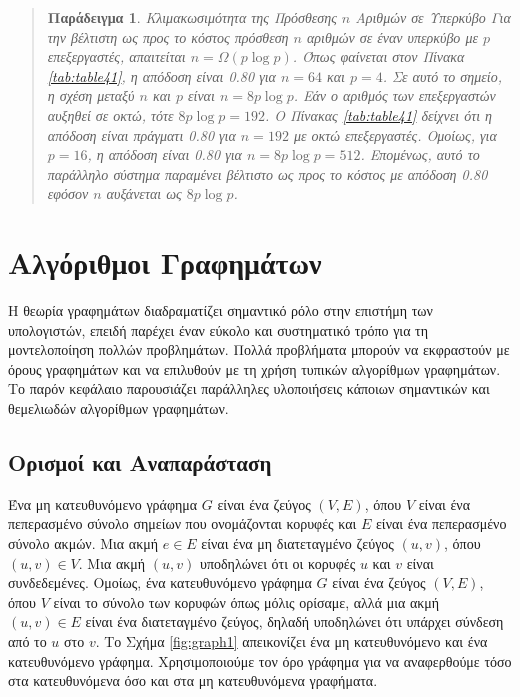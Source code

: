 \documentclass[12pt,a4paper]{article}
\newtheorem{paradeigma}{Παράδειγμα}
\begin{document}
\begin{quote}
\begin{paradeigma} \label{par:10} Κλιμακωσιμότητα της Πρόσθεσης $n$ 
  Αριθμών σε Υπερκύβο
Για την βέλτιστη ως προς το κόστος πρόσθεση $n$ αριθμών σε έναν υπερκύβο 
με $p$ επεξεργαστές, απαιτείται $n = \Omega(p \log p)$. Όπως φαίνεται στον 
Πίνακα \ref{tab:table41}, η απόδοση είναι 0.80 για $n = 64$ και $p = 4$. 
Σε αυτό το σημείο, η σχέση μεταξύ $n$ και $p$ είναι $n = 8p \log p$. Εάν 
ο αριθμός των επεξεργαστών αυξηθεί σε οκτώ, τότε $8p \log p = 192$. Ο 
Πίνακας \ref{tab:table41} δείχνει ότι η απόδοση είναι πράγματι 0.80 για 
$n = 192$ με οκτώ επεξεργαστές. Ομοίως, για $p = 16$, η απόδοση είναι 
0.80 για $n = 8p \log p = 512$. Επομένως, αυτό το παράλληλο σύστημα 
παραμένει βέλτιστο ως προς το κόστος με απόδοση 0.80 εφόσον $n$ αυξάνεται 
ως $8p \log p$.
\end{paradeigma}
\end{quote}
\vspace{0.2cm}

\section{Αλγόριθμοι Γραφημάτων}
Η θεωρία γραφημάτων διαδραματίζει σημαντικό ρόλο στην επιστήμη των υπολογιστών, επειδή παρέχει έναν εύκολο και συστηματικό τρόπο για τη μοντελοποίηση πολλών προβλημάτων. Πολλά προβλήματα μπορούν να εκφραστούν με όρους γραφημάτων και να επιλυθούν με τη χρήση τυπικών αλγορίθμων γραφημάτων. Το παρόν κεφάλαιο παρουσιάζει παράλληλες υλοποιήσεις κάποιων σημαντικών και θεμελιωδών αλγορίθμων γραφημάτων.

\subsection{Ορισμοί και Αναπαράσταση}
Ένα μη κατευθυνόμενο γράφημα $G$ είναι ένα ζεύγος $(V, E)$, όπου $V$ είναι ένα πεπερασμένο σύνολο σημείων που ονομάζονται κορυφές και $E$ είναι
ένα πεπερασμένο σύνολο ακμών. Μια ακμή $e \in E$
 είναι ένα μη διατεταγμένο ζεύγος $(u, v)$, όπου $(u, v) \in V$. Μια ακμή $(u, v)$
υποδηλώνει ότι οι κορυφές $u$ και $v$ είναι συνδεδεμένες. Ομοίως, ένα κατευθυνόμενο γράφημα $G$ είναι ένα ζεύγος $(V, E)$,
όπου $V$ είναι το σύνολο των κορυφών όπως μόλις ορίσαμε, αλλά μια ακμή $(u, v) \in E$ είναι ένα διατεταγμένο ζεύγος, δηλαδή
υποδηλώνει ότι υπάρχει σύνδεση από το $u$ στο $v$. Το Σχήμα \ref{fig:graph1} απεικονίζει ένα μη κατευθυνόμενο και ένα
κατευθυνόμενο γράφημα. Χρησιμοποιούμε τον όρο γράφημα για να αναφερθούμε τόσο στα κατευθυνόμενα όσο και στα μη κατευθυνόμενα γραφήματα.
\end{document}
